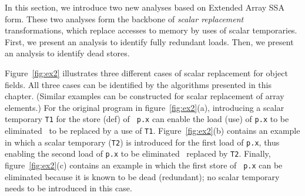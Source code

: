 In this section, we introduce two new analyses based on Extended
Array SSA form.  These two analyses form the backbone of 
{\em scalar replacement} transformations, which replace accesses
to memory by uses of scalar temporaries.  First, we present an
analysis to identify fully redundant loads.  Then, we present an
analysis to identify dead stores.

Figure~\ref{fig:ex2} illustrates three different cases of scalar
replacement for object fields. 
All three cases can be identified by the algorithms presented in this chapter.
(Similar examples can 
be constructed for scalar replacement of array elements.)
For the original program in figure~\ref{fig:ex2}(a),
introducing a scalar temporary {\tt T1} for the store (def) of {\tt
p.x} can enable the load (use) of {\tt p.x} to be eliminated \ie\ to
be replaced by a use of {\tt T1}.  Figure~\ref{fig:ex2}(b)
contains an example in which a scalar temporary ({\tt T2}) is
introduced for the first load of {\tt p.x}, thus enabling the second
load of {\tt p.x} to be eliminated \ie\ replaced by {\tt T2}.  Finally,
figure~\ref{fig:ex2}(c) contains an example in which the first store of {\tt
p.x} can be eliminated because it is known to be dead (redundant); no
scalar temporary needs to be introduced in this case.
